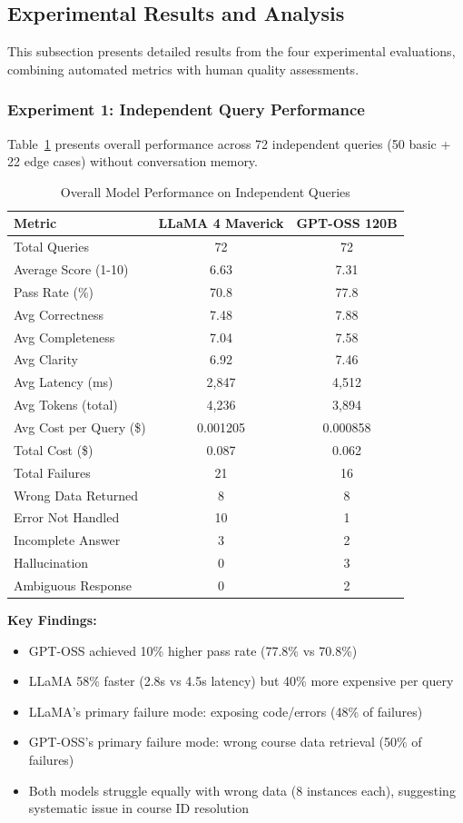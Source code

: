 \documentclass{article}
\begin{document}
\subsection{Experimental Results and Analysis}

This subsection presents detailed results from the four experimental evaluations, combining automated metrics with human quality assessments.

\subsubsection{Experiment 1: Independent Query Performance}

Table~\ref{tab:overall_performance} presents overall performance across 72 independent queries (50 basic + 22 edge cases) without conversation memory.

\begin{table}[h]
\centering
\caption{Overall Model Performance on Independent Queries}
\label{tab:overall_performance}
\begin{tabular}{lcc}
\toprule
\textbf{Metric} & \textbf{LLaMA 4 Maverick} & \textbf{GPT-OSS 120B} \\
\midrule
Total Queries & 72 & 72 \\
Average Score (1-10) & 6.63 & 7.31 \\
Pass Rate (\%) & 70.8 & 77.8 \\
Avg Correctness & 7.48 & 7.88 \\
Avg Completeness & 7.04 & 7.58 \\
Avg Clarity & 6.92 & 7.46 \\
\midrule
Avg Latency (ms) & 2,847 & 4,512 \\
Avg Tokens (total) & 4,236 & 3,894 \\
Avg Cost per Query (\$) & 0.001205 & 0.000858 \\
Total Cost (\$) & 0.087 & 0.062 \\
\midrule
Total Failures & 21 & 16 \\
Wrong Data Returned & 8 & 8 \\
Error Not Handled & 10 & 1 \\
Incomplete Answer & 3 & 2 \\
Hallucination & 0 & 3 \\
Ambiguous Response & 0 & 2 \\
\bottomrule
\end{tabular}
\end{table}

\textbf{Key Findings:}
\begin{itemize}
    \item GPT-OSS achieved 10\% higher pass rate (77.8\% vs 70.8\%)
    \item LLaMA 58\% faster (2.8s vs 4.5s latency) but 40\% more expensive per query
    \item LLaMA's primary failure mode: exposing code/errors (48\% of failures)
    \item GPT-OSS's primary failure mode: wrong course data retrieval (50\% of failures)
    \item Both models struggle equally with wrong data (8 instances each), suggesting systematic issue in course ID resolution
\end{itemize}
\end{document}
